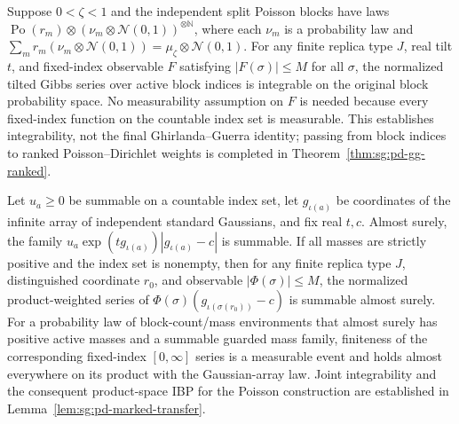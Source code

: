 \begin{lemma}\label{lem:sg:pd-bounded-blocks}
  \leanok
  Suppose $0<\zeta<1$ and the independent split Poisson blocks have laws
  $\operatorname{Po}(r_m)\otimes(\nu_m\otimes\mathcal N(0,1))^{\otimes\mathbb N}$,
  where each $\nu_m$ is a probability law and
  $\sum_m r_m(\nu_m\otimes\mathcal N(0,1))
    =\mu_\zeta\otimes\mathcal N(0,1)$.
  For any finite replica type $J$, real tilt $t$, and fixed-index observable
  $F$ satisfying $|F(\sigma)|\le M$ for all $\sigma$, the normalized tilted
  Gibbs series over active block indices is integrable on the original block
  probability space. No measurability assumption on $F$ is needed because
  every fixed-index function on the countable index set is measurable.
  This establishes integrability, not the final Ghirlanda--Guerra identity;
  passing from block indices to ranked Poisson--Dirichlet weights is completed in Theorem~\ref{thm:sg:pd-gg-ranked}.
\end{lemma}

\begin{lemma}\label{lem:sg:pd-marked-summability}
  \leanok
  Let $u_a\ge0$ be summable on a countable index set, let $g_{\iota(a)}$ be
  coordinates of the infinite array of independent standard Gaussians, and
  fix real $t,c$. Almost surely, the family
  $u_a\exp(tg_{\iota(a)})|g_{\iota(a)}-c|$ is summable. If all masses are
  strictly positive and the index set is nonempty, then for any finite
  replica type $J$, distinguished coordinate $r_0$, and observable
  $|\Phi(\sigma)|\le M$, the normalized product-weighted series of
  $\Phi(\sigma)(g_{\iota(\sigma(r_0))}-c)$ is summable almost surely.
  For a probability law of block-count/mass environments that almost surely
  has positive active masses and a summable guarded mass family, finiteness of
  the corresponding fixed-index $[0,\infty]$ series is a measurable event
  and holds almost everywhere on its product with the Gaussian-array law.
  Joint integrability and the consequent product-space IBP for the Poisson
  construction are established in Lemma~\ref{lem:sg:pd-marked-transfer}.
\end{lemma}

